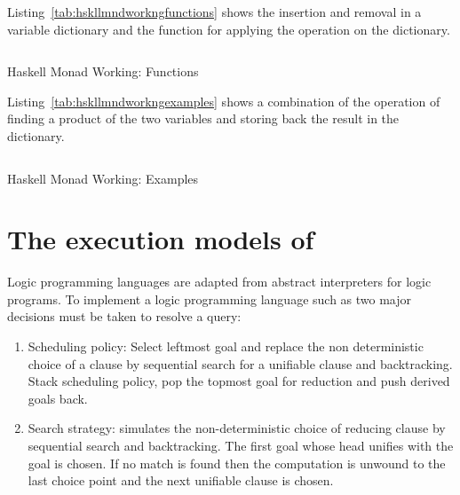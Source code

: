\documentclass[proposal.tex]{subfiles}
\begin{document}
Listing~\ref{tab:hskllmndworkngfunctions} shows the insertion and removal in a variable dictionary and the  function 
for applying the operation on the dictionary.

\begin{code-list}[H]
  \begin{singlespace}
    \inputminted[linenos, firstline=35, lastline=76]{haskell}{haskell-monad-working-2.hs}
  \end{singlespace}
  \caption{Haskell Monad Working: Functions}
\label{tab:hskllmndworkngfunctions}
\end{code-list}

Listing~\ref{tab:hskllmndworkngexamples} shows a combination of the operation of finding a product of the two variables and 
storing back the result in the dictionary.


\begin{code-list}[H]
  \begin{singlespace}
    \inputminted[linenos, firstline=81, lastline=123]{haskell}{haskell-monad-working-2.hs}
  \end{singlespace}
  \caption{Haskell Monad Working: Examples}
\label{tab:hskllmndworkngexamples}
\end{code-list}


\section[{The execution models of \progLang{Prolog}}]{The execution models of  \cite{Sterling:1994:APA:175753}
}\label{sec:exec-models-prolog}
Logic programming languages are adapted from abstract interpreters for logic programs. 
To implement a logic programming language such as  two major decisions must be taken to resolve a query:
\begin{enumerate}
\item Scheduling policy:
Select leftmost goal and replace the non deterministic choice of a clause by sequential search for a unifiable clause and backtracking. 
Stack scheduling policy, pop the topmost goal for reduction and push derived goals back.

\item Search strategy:
 simulates the non-deterministic choice of reducing clause by sequential search and backtracking. The first goal whose 
head unifies with the goal is chosen. If no match is found then the computation is unwound to the last choice point and the next unifiable 
clause is chosen.
\end{enumerate}
\end{document}
